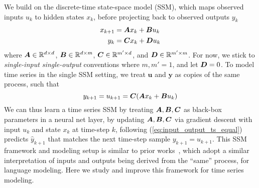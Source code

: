 We build on the discrete-time state-space model (SSM), which maps observed inputs $u_k$ to hidden states $x_k$, before projecting back to observed outputs $y_k$
\begin{align}
    x_{k+1} &= \boldsymbol{A} x_k + \boldsymbol{B} u_k  \label{eq:discrete_ssm_state} \\
    y_k &= \boldsymbol{C} x_k + \boldsymbol{D} u_k \label{eq:discrete_ssm_output}
\end{align}
where $\boldsymbol{A}\in\mathbb{R}^{d\times d}$, $\boldsymbol{B}\in\mathbb{R}^{d \times m}$, $\boldsymbol{C}\in\mathbb{R}^{m' \times d}$, and $\boldsymbol{D}\in\mathbb{R}^{m' \times m}$. 
%
For now,  
we stick to \emph{single-input single-output} conventions where $m, m' = 1$, and let $\boldsymbol{D} = 0$. 
%
To model time series in the single SSM setting, we treat $\boldsymbol{u}$ and $\boldsymbol{y}$ as copies of the same process, such that  
\begin{equation}
    y_{k + 1} = u_{k + 1} = \boldsymbol{C}(\boldsymbol{A} x_k + \boldsymbol{B} u_k)
\label{eq:input_output_ts_equal}
\end{equation}
We can thus learn a time series SSM by treating $\boldsymbol{A}, \boldsymbol{B}, \boldsymbol{C}$ as black-box parameters in a neural net layer, \ie{} by updating $\boldsymbol{A}, \boldsymbol{B}, \boldsymbol{C}$ via gradient descent \st{} with input $u_k$ and state $x_k$ at time-step $k$, following (\ref{eq:input_output_ts_equal}) predicts $\hat{y}_{k + 1}$ that matches the next time-step sample $y_{k + 1} = u_{k + 1}$.
%
This SSM framework and modeling setup is similar to prior works~\citep{gu2021combining, gu2021efficiently}, which adopt a similar interpretation of inputs and outputs being derived from the ``same'' process, \eg{} for language modeling. Here we study and improve this framework for time series modeling.
